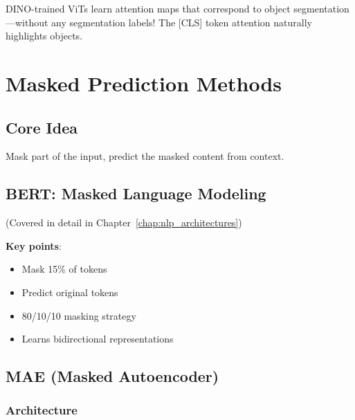 \begin{keyinsight}
DINO-trained ViTs learn attention maps that correspond to object segmentation—without any segmentation labels! The [CLS] token attention naturally highlights objects.
\end{keyinsight}

\section{Masked Prediction Methods}
\label{sec:masked_prediction}

\subsection{Core Idea}

Mask part of the input, predict the masked content from context.

\subsection{BERT: Masked Language Modeling}

(Covered in detail in Chapter~\ref{chap:nlp_architectures})

\textbf{Key points}:
\begin{itemize}
    \item Mask 15\% of tokens
    \item Predict original tokens
    \item 80/10/10 masking strategy
    \item Learns bidirectional representations
\end{itemize}

\subsection{MAE (Masked Autoencoder)}

\subsubsection{Architecture}

